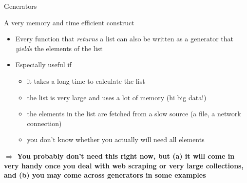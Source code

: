 \begin{frame}[fragile]{Generators}
	\begin{alertblock}{A very memory and time efficient construct}
		\begin{itemize}
			\item Every function that \emph{returns} a list can also be written as a generator that \emph{yields} the elements of the list
			\item Especially useful if
			\begin{itemize}
				\item it takes a long time to calculate the list
				\item the list is very large and uses a lot of memory (hi big data!)
				\item the elements in the list are fetched from a slow source (a file, a network connection)
				\item you don't know whether you actually will need all elements
			\end{itemize}
		\end{itemize}

		\end{alertblock}
		\textbf{$\Rightarrow$ You probably don't need this right now, but (a) it will come in very handy once you deal with web scraping or very large collections, and (b) you may come across generators in some examples}
		\end{frame}
